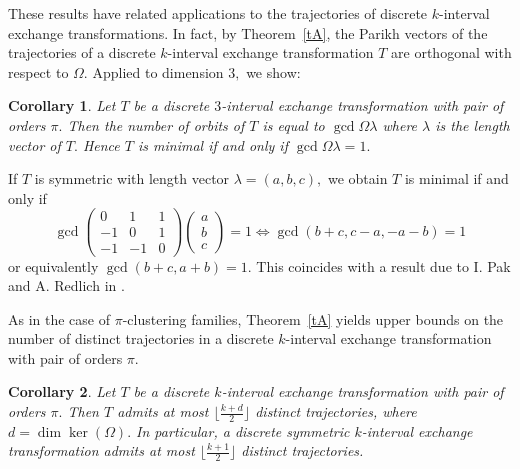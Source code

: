 \documentclass[12pt,a4paper]{amsart}
\newcommand{\A}{{\mathbb A}}
\newtheorem{corollary}{Corollary}
\begin{document}
These results have related applications to the trajectories of discrete $k$-interval exchange transformations. 
In fact, %
by Theorem~\ref{tA}, the Parikh vectors of the trajectories of a discrete $k$-interval exchange transformation $T$ are orthogonal with respect to $\Omega.$ Applied to dimension $3,$ we show:

\begin{corollary}\label{cB} Let $T$ be a discrete $3$-interval exchange transformation with pair of orders $\pi.$  Then the number of orbits of $T$ is equal to $\gcd \Omega \lambda$ where $\lambda$ is the length vector of $T.$  Hence $T$ is minimal if and only if  
$\gcd \Omega \lambda=1.$
\end{corollary}

 If $T$ is symmetric with length vector $\lambda=(a,b,c),$ we obtain $T$ is minimal if and only if 
\[\gcd \begin{pmatrix}0&1&1\\-1&0&1\\-1&-1&0 \end{pmatrix}\begin{pmatrix}a\\b\\c \end{pmatrix}=1 \Leftrightarrow \gcd (b+c,c-a, -a-b)=1\]
or equivalently $\gcd (b+c,a+b)=1.$ This coincides with a result due to I. Pak and A. Redlich in \cite{PR}.

As in the case of $\pi$-clustering families, Theorem~\ref{tA} yields upper bounds on the number of distinct trajectories in a discrete $k$-interval exchange transformation with pair of orders $\pi.$ 

\begin{corollary}\label{cC} Let $T$ be a discrete $k$-interval exchange transformation with pair of orders $\pi.$  Then $T$ admits at most $\lfloor \frac {k+d}{2} \rfloor$ distinct trajectories, where $d=\dim \ker (\Omega).$ In particular, a discrete symmetric $k$-interval exchange transformation admits at most $\lfloor \frac {k+1}{2} \rfloor$ distinct trajectories. \end{corollary}
\end{document}
